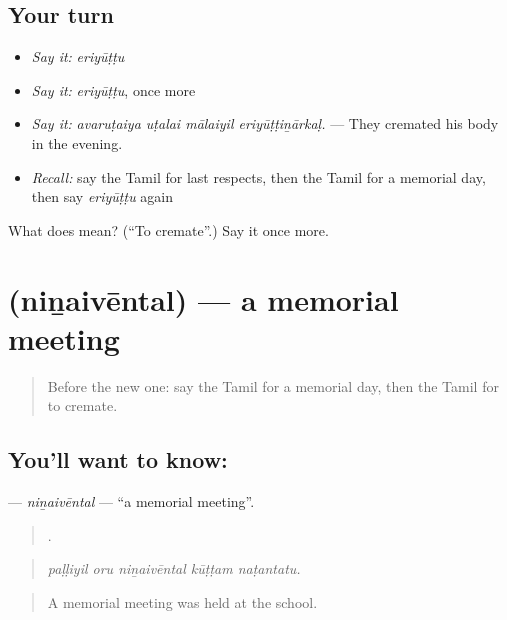 \subsection*{Your turn}
\begin{itemize}
\raggedright
  \item \emph{Say it:} \emph{eriyūṭṭu}
  \item \emph{Say it:} \emph{eriyūṭṭu}, once more
  \item \emph{Say it:} \emph{avaruṭaiya uṭalai mālaiyil eriyūṭṭiṉārkaḷ.} — They cremated his body in the evening.
  \item \emph{Recall:} say the Tamil for last respects, then the Tamil for a memorial day, then say \emph{eriyūṭṭu} again
\end{itemize}

\begin{tcolorbox}[breakable,colback=teal!4,colframe=teal!35!black,title={Before you move on}]
What does  mean? (\textquotedblleft{}To cremate\textquotedblright{}.) Say it once more.
\end{tcolorbox}
\section[\texorpdfstring{\ta{நினைவேந்தல்} (niṉaivēntal)}{நினைவேந்தல் (niṉaivēntal)}]{ (niṉaivēntal) — a memorial meeting}

\label{lesson:TA-C324-ninaivental}



\begin{quote}
Before the new one: say the Tamil for a memorial day, then the Tamil for to cremate.
\end{quote}

\subsection*{You'll want to know: }
\textbf{} — \emph{niṉaivēntal} — \textquotedblleft{}a memorial meeting\textquotedblright{}.

\begin{quote}
    .
\end{quote}

\begin{quote}
\emph{paḷḷiyil oru niṉaivēntal kūṭṭam naṭantatu.}
\end{quote}

\begin{quote}
A memorial meeting was held at the school.
\end{quote}

